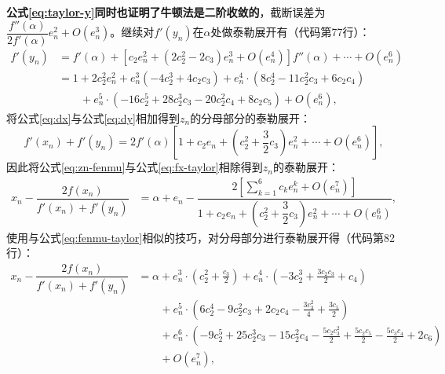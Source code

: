 \textbf{公式\ref{eq:taylor-y}同时也证明了牛顿法是二阶收敛的}，截断误差为$\dfrac{f''(\alpha)}{2f'(\alpha)}e_n^2 + O(e_n^3)$。继续对$f'(y_n)$在$\alpha$处做泰勒展开有（代码第77行）：
\begin{equation}
    \label{eq:dy}
    \begin{aligned}
        f'(y_n) &= f'(\alpha) + [c_2e_n^2 + (2c_2^2 - 2c_3)e_n^3 + O(e_n^4)]f''(\alpha) + \cdots + O(e_n^6) \\
        &= 1 + 2 c_{2}^{2} e_n^{2} + e_n^{3} \left(- 4 c_{2}^{3} + 4 c_{2} c_{3}\right) + e_n^{4} \cdot \left(8 c_{2}^{4} - 11 c_{2}^{2} c_{3} + 6 c_{2} c_{4}\right) \\
        &\qquad + e_n^{5} \cdot \left(- 16 c_{2}^{5} + 28 c_{2}^{3} c_{3} - 20 c_{2}^{2} c_{4} + 8 c_{2} c_{5}\right) + O\left(e_n^{6}\right),
    \end{aligned}
\end{equation}
将公式\ref{eq:dx}与公式\ref{eq:dy}相加得到$z_n$的分母部分的泰勒展开：
\begin{equation}
    \label{eq:zn-fenmu}
    f'(x_n) + f'(y_n) = 2f'(\alpha)\left[ 1 + c_2e_n + \left( c_2^2 + \dfrac{3}{2}c_3 \right)e_n^2 + \cdots + O(e_n^6) \right],
\end{equation}
因此将公式\ref{eq:zn-fenmu}与公式\ref{eq:fx-taylor}相除得到$z_n$的泰勒展开：
\begin{equation}
    \begin{aligned}
        x_n - \dfrac{2f(x_n)}{f'(x_n) + f'(y_n)} &= \alpha + e_n - \dfrac{2\left[ \sum\limits_{k=1}^6 c_ke_n^k + O(e_n^7) \right]}{1 + c_2e_n+ \left(c_2^2 + \dfrac{3}{2}c_3  \right)e_n^2 + \cdots + O(e_n^6)},
    \end{aligned}
\end{equation}
使用与公式\ref{eq:fenmu-taylor}相似的技巧，对分母部分进行泰勒展开得（代码第82行）：
\begin{equation}
    \label{eq:taylor-z}
    \begin{aligned}
        x_n - \dfrac{2f(x_n)}{f'(x_n) + f'(y_n)} &= \alpha + e_n^{3} \cdot \left(c_{2}^{2} + \frac{c_{3}}{2}\right) + e_n^{4} \cdot \left(- 3 c_{2}^{3} + \frac{3 c_{2} c_{3}}{2} + c_{4}\right) \\
        &\qquad + e_n^{5} \cdot \left(6 c_{2}^{4} - 9 c_{2}^{2} c_{3} + 2 c_{2} c_{4} - \frac{3 c_{3}^{2}}{4} + \frac{3 c_{5}}{2}\right) \\
        &\qquad + e_n^{6} \cdot \left(- 9 c_{2}^{5} + 25 c_{2}^{3} c_{3} - 15 c_{2}^{2} c_{4} - \frac{5 c_{2} c_{3}^{2}}{2} + \frac{5 c_{2} c_{5}}{2} - \frac{5 c_{3} c_{4}}{2} + 2 c_{6}\right) \\
        &\qquad + O\left(e_n^{7}\right),
    \end{aligned}
\end{equation}

